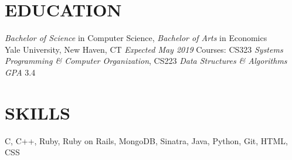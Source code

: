 \documentclass[margin, centered]{res}
\begin{document}
\address{\href{mailto:melina.delgado@yale.edu}{melina.delgado@yale.edu} | \href{http://melinadelgado.com}{melinadelgado.com} \\ 71 Bristol St, New Haven, CT 06511 | (954) 682-8999}

\begin{resume}
  \section{EDUCATION}
  \textit{Bachelor of Science} in Computer Science, \textit{Bachelor of Arts} in Economics \\
  Yale University, New Haven, CT \textit{Expected May 2019} \newline
  Courses: CS323 \textit{Systems Programming \& Computer Organization}, CS223 \textit{Data Structures \& Algorithms} \\ 
  \textit{GPA} 3.4

  \section{SKILLS}
  C, C++, Ruby, Ruby on Rails, MongoDB, Sinatra, Java, Python, Git, HTML, CSS


\end{resume}
\end{document}

